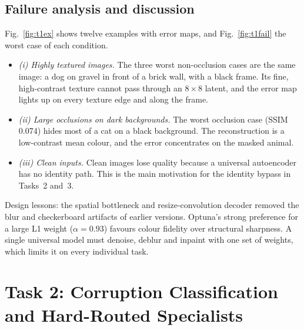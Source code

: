 \documentclass[conference]{IEEEtran}
\begin{document}
\subsection{Failure analysis and discussion}
Fig.~\ref{fig:t1ex} shows twelve examples with error maps, and Fig.~\ref{fig:t1fail} the worst case of each condition.
\begin{itemize}
\item \emph{(i) Highly textured images.} The three worst non-occlusion cases are the same image: a dog on gravel in front of a brick wall, with a black frame. Its fine, high-contrast texture cannot pass through an $8{\times}8$ latent, and the error map lights up on every texture edge and along the frame.
\item \emph{(ii) Large occlusions on dark backgrounds.} The worst occlusion case (SSIM 0.074) hides most of a cat on a black background. The reconstruction is a low-contrast mean colour, and the error concentrates on the masked animal.
\item \emph{(iii) Clean inputs.} Clean images lose quality because a universal autoencoder has no identity path. This is the main motivation for the identity bypass in Tasks~2 and~3.
\end{itemize}
Design lessons: the spatial bottleneck and resize-convolution decoder removed the blur and checkerboard artifacts of earlier versions. Optuna's strong preference for a large L1 weight ($\alpha{=}0.93$) favours colour fidelity over structural sharpness. A single universal model must denoise, deblur and inpaint with one set of weights, which limits it on every individual task.

\section{Task 2: Corruption Classification and Hard-Routed Specialists}\label{sec:t2}
\end{document}

